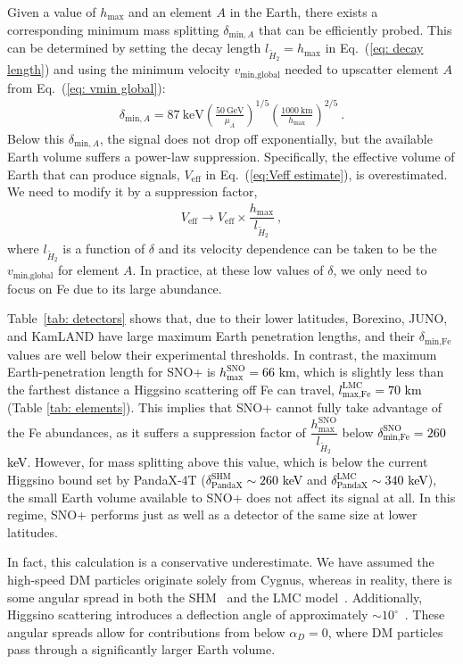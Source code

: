 \documentclass[aps,prd,amsmath,amssymb,10pt,letterpaper,balancelastpage,showpacs,superscriptaddress,nofootinbib,floatfix,notitlepage,longbibliography,twocolumn
]{revtex4-2}
\newcommand{\numcolor}[1]{\textcolor{black}{#1}}
\newcommand{\Eq}[1]{Eq.~(#1)}
\newcommand{\Veff}{V_{\text{eff}}}
\newcommand{\vglobalmin}{v_{\text{min,global}}}
\newcommand{\lmaxLMC}[1]{l^{\text{LMC}}_{\text{max,#1}}}
\newcommand{\hmax}{h_{\text{max}}}
\newcommand{\deltaminA}{\delta_{\text{min},A}}
\newcommand{\deltaminFe}{\delta_{\text{min,Fe}}}
\newcommand{\lH}{l_{\tilde{H}_2}}
\begin{document}
Given a value of $\hmax$ and an element $A$ in the Earth, there exists a corresponding minimum mass splitting $\deltaminA$ that can be efficiently probed. This can be determined by setting the decay length $\lH=\hmax$ in \Eq{\ref{eq: decay length}} and using the minimum velocity $\vglobalmin$ needed to upscatter element $A$ from \Eq{\ref{eq: vmin global}}:
\begin{align} \label{eq: deltaminA}
\deltaminA = 87~\text{keV} \left(\frac{50~\text{GeV}}{\mu_{A}}\right) ^{1/5} \left(\frac{1000~\text{km}}{\hmax}\right)^{2/5}~.
\end{align}
Below this $\deltaminA$, the signal does not drop off exponentially, but the available Earth volume suffers a power-law suppression. Specifically, the effective volume of Earth that can produce signals, $\Veff$ in \Eq{\ref{eq:Veff estimate}}, is overestimated. We need to modify it by a suppression factor,
\begin{align}
\Veff \to \Veff \times \dfrac{\hmax}{\lH} ~,
\end{align}
where $\lH$ is a function of $\delta$ and its velocity dependence can be taken to be the $\vglobalmin$ for element $A$. In practice, at these low values of $\delta$, we only need to focus on Fe due to its large abundance. 

Table~\ref{tab: detectors} shows that, due to their lower latitudes, Borexino, JUNO, and KamLAND have large maximum Earth penetration lengths, and their $\deltaminFe$ values are well below their experimental thresholds. In contrast, the maximum Earth-penetration length for SNO+ is \numcolor{$\hmax^{\text{SNO}}=66$ km}, which is slightly less than the farthest distance a Higgsino scattering off Fe can travel, \numcolor{$\lmaxLMC{Fe} = 70$ km} (Table \ref{tab: elements}). This implies that SNO+ cannot fully take advantage of the Fe abundances, as it suffers a suppression factor of $\dfrac{h_{\text{max}}^{\text{SNO}}}{\lH}$ below \numcolor{$\deltaminFe^{\text{SNO}} = 260$ keV}. 
However, for mass splitting above this value, which is below the current Higgsino bound set by PandaX-4T (\numcolor{$\delta^{\text{SHM}}_{\text{PandaX}} \sim 260$ keV} and \numcolor{$\delta^{\text{LMC}}_{\text{PandaX}} \sim 340$ keV}), the small Earth volume available to SNO+ does not affect its signal at all. In this regime, SNO+ performs just as well as a detector of the same size at lower latitudes.

In fact, this calculation is a conservative underestimate. We have assumed the high-speed DM particles originate solely from Cygnus, whereas in reality, there is some angular spread in both the SHM~\cite{Luminous} and the LMC model~\cite{LMCHighSpeed}. Additionally, Higgsino scattering introduces a deflection angle of approximately  $\sim 10^{\circ}$~\cite{Luminous}. These angular spreads allow for contributions from below $\alpha_D = 0$, where DM particles pass through a significantly larger Earth volume.
\end{document}
